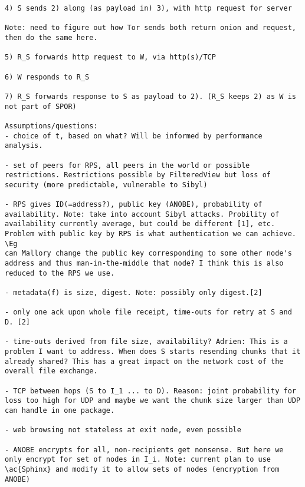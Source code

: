 \begin{verbatim}
4) S sends 2) along (as payload in) 3), with http request for server

Note: need to figure out how Tor sends both return onion and request, then do the same here.

5) R_S forwards http request to W, via http(s)/TCP

6) W responds to R_S

7) R_S forwards response to S as payload to 2). (R_S keeps 2) as W is not part of SPOR) 

Assumptions/questions:
- choice of t, based on what? Will be informed by performance analysis.

- set of peers for RPS, all peers in the world or possible restrictions. Restrictions possible by FilteredView but loss of security (more predictable, vulnerable to Sibyl)

- RPS gives ID(=address?), public key (ANOBE), probability of availability. Note: take into account Sibyl attacks. Probility of availability currently average, but could be different [1], etc. Problem with public key by RPS is what authentication we can achieve. \Eg 
can Mallory change the public key corresponding to some other node's 
address and thus man-in-the-middle that node? I think this is also 
reduced to the RPS we use.

- metadata(f) is size, digest. Note: possibly only digest.[2]

- only one ack upon whole file receipt, time-outs for retry at S and D. [2]

- time-outs derived from file size, availability? Adrien: This is a problem I want to address. When does S starts resending chunks that it already shared? This has a great impact on the network cost of the overall file exchange.

- TCP between hops (S to I_1 ... to D). Reason: joint probability for loss too high for UDP and maybe we want the chunk size larger than UDP can handle in one package.

- web browsing not stateless at exit node, even possible

- ANOBE encrypts for all, non-recipients get nonsense. But here we only encrypt for set of nodes in I_i. Note: current plan to use \ac{Sphinx} and modify it to allow sets of nodes (encryption from ANOBE)



\end{verbatim}
